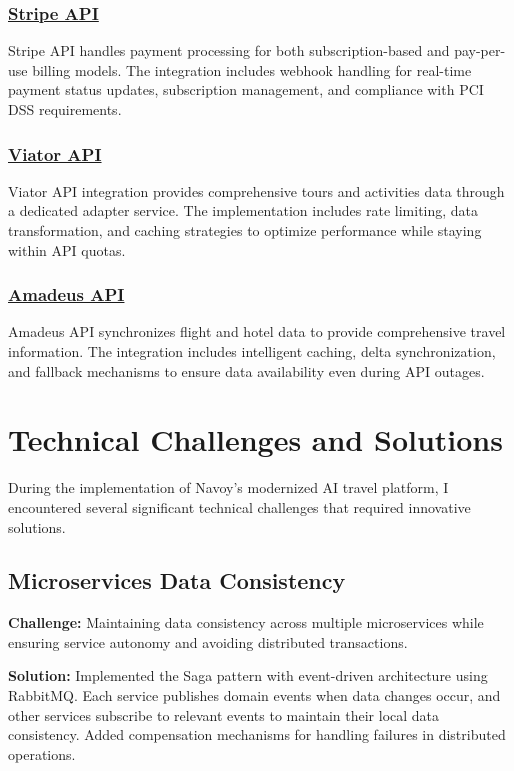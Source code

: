\subsubsection*{\underline{Stripe API}}
Stripe API handles payment processing for both subscription-based and pay-per-use billing models. The integration includes webhook handling for real-time payment status updates, subscription management, and compliance with PCI DSS requirements.

\subsubsection*{\underline{Viator API}}
Viator API integration provides comprehensive tours and activities data through a dedicated adapter service. The implementation includes rate limiting, data transformation, and caching strategies to optimize performance while staying within API quotas.

\subsubsection*{\underline{Amadeus API}}
Amadeus API synchronizes flight and hotel data to provide comprehensive travel information. The integration includes intelligent caching, delta synchronization, and fallback mechanisms to ensure data availability even during API outages.

\section{Technical Challenges and Solutions}
During the implementation of Navoy's modernized AI travel platform, I encountered several significant technical challenges that required innovative solutions.

\subsection{Microservices Data Consistency}
\textbf{Challenge:} Maintaining data consistency across multiple microservices while ensuring service autonomy and avoiding distributed transactions.

\textbf{Solution:} Implemented the Saga pattern with event-driven architecture using RabbitMQ. Each service publishes domain events when data changes occur, and other services subscribe to relevant events to maintain their local data consistency. Added compensation mechanisms for handling failures in distributed operations.

